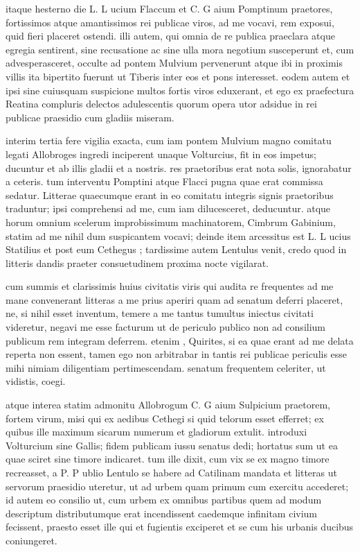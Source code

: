  itaque hesterno die L. L ucium Flaccum et C. G aium Pomptinum praetores, fortissimos atque amantissimos rei publicae viros, ad me vocavi, rem exposui, quid fieri placeret ostendi. illi autem, qui omnia de re publica praeclara atque egregia sentirent, sine recusatione ac sine ulla mora negotium susceperunt et, cum advesperasceret, occulte ad pontem Mulvium pervenerunt atque ibi in proximis villis ita bipertito fuerunt ut Tiberis inter eos et pons interesset. eodem autem et ipsi sine cuiusquam suspicione multos fortis viros eduxerant, et ego ex praefectura Reatina compluris delectos adulescentis quorum opera utor adsidue in rei publicae praesidio cum gladiis miseram.

 interim tertia fere vigilia exacta, cum iam pontem Mulvium magno comitatu legati Allobroges ingredi inciperent unaque Volturcius, fit in eos impetus; ducuntur et ab illis gladii et a nostris. res praetoribus erat nota solis, ignorabatur a ceteris. tum interventu Pomptini atque Flacci pugna quae erat commissa sedatur. Litterae quaecumque erant in eo comitatu integris signis praetoribus traduntur; ipsi comprehensi ad me, cum iam dilucesceret, deducuntur. atque horum omnium scelerum improbissimum machinatorem, Cimbrum Gabinium, statim ad me nihil dum suspicantem vocavi; deinde item arcessitus est L. L ucius Statilius et post eum Cethegus ; tardissime autem Lentulus venit, credo quod in litteris dandis praeter consuetudinem proxima nocte vigilarat.

 cum summis et clarissimis huius civitatis viris qui audita re frequentes ad me mane convenerant litteras a me prius aperiri quam ad senatum deferri placeret, ne, si nihil esset inventum, temere a me tantus tumultus iniectus civitati videretur, negavi me esse facturum ut de periculo publico non ad consilium publicum rem integram deferrem. etenim , Quirites, si ea quae erant ad me delata reperta non essent, tamen ego non arbitrabar in tantis rei publicae periculis esse mihi nimiam diligentiam pertimescendam. senatum frequentem celeriter, ut vidistis, coegi.

 atque interea statim admonitu Allobrogum C. G aium Sulpicium praetorem, fortem virum, misi qui ex aedibus Cethegi si quid telorum esset efferret; ex quibus ille maximum sicarum numerum et gladiorum extulit. introduxi Volturcium sine Gallis; fidem publicam iussu senatus dedi; hortatus sum ut ea quae sciret sine timore indicaret. tum ille dixit, cum vix se ex magno timore recreasset, a P. P ublio Lentulo se habere ad Catilinam mandata et litteras ut servorum praesidio uteretur, ut ad urbem quam primum cum exercitu accederet; id autem eo consilio ut, cum urbem ex omnibus partibus quem ad modum descriptum distributumque erat incendissent caedemque infinitam civium fecissent, praesto esset ille qui et fugientis exciperet et se cum his urbanis ducibus coniungeret.

